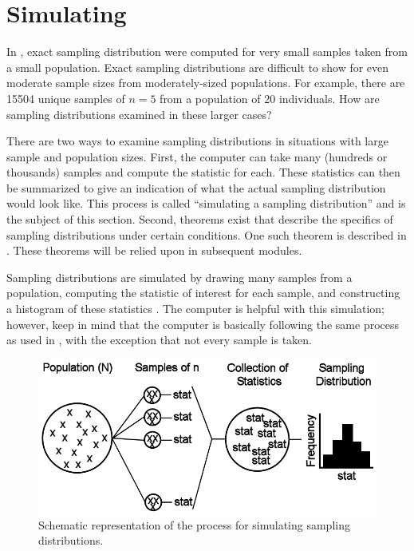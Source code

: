 \documentclass[10pt,openany]{book}\usepackage[]{graphicx}\usepackage[]{color}
\begin{document}


\vspace{-12pt}
\section{Simulating}  \label{sect:SDSimulate}
\vspace{-12pt}
In , exact sampling distribution were computed for very small samples taken from a small population.  Exact sampling distributions are difficult to show for even moderate sample sizes from moderately-sized populations.  For example, there are 15504 unique samples of $n=5$ from a population of 20 individuals.  How are sampling distributions examined in these larger cases?

There are two ways to examine sampling distributions in situations with large sample and population sizes.  First, the computer can take many (hundreds or thousands) samples and compute the statistic for each.  These statistics can then be summarized to give an indication of what the actual sampling distribution would look like.  This process is called ``simulating a sampling distribution'' and is the subject of this section.  Second, theorems exist that describe the specifics of sampling distributions under certain conditions.  One such theorem is described in .  These theorems will be relied upon in subsequent modules.


Sampling distributions are simulated by drawing many samples from a population, computing the statistic of interest for each sample, and constructing a histogram of these statistics .  The computer is helpful with this simulation; however, keep in mind that the computer is basically following the same process as used in , with the exception that not every sample is taken.

\begin{figure}[htbp]
  \centering
    \includegraphics[width=4.5in]{Figs/Sampling_Distribution_Scheme.png}
  \caption{Schematic representation of the process for simulating sampling distributions.}
  \label{fig:SamplingDistributionScheme}
\end{figure}
\end{document}
